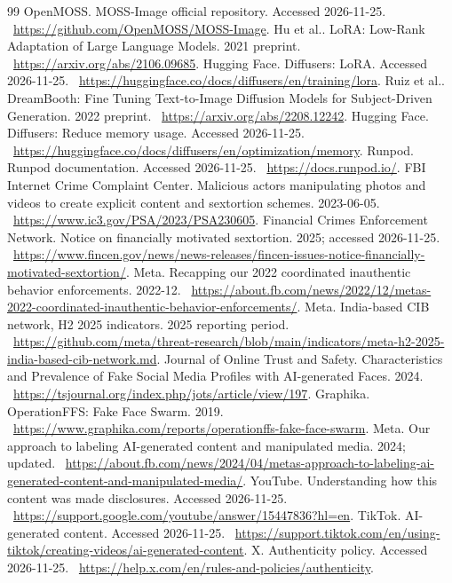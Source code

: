 \documentclass[11pt,a4paper]{article}
\begin{document}
\begin{thebibliography}{99}
 OpenMOSS. MOSS-Image official repository. Accessed 2026-11-25. \ \url{https://github.com/OpenMOSS/MOSS-Image}.
 Hu et al.. LoRA: Low-Rank Adaptation of Large Language Models. 2021 preprint. \ \url{https://arxiv.org/abs/2106.09685}.
 Hugging Face. Diffusers: LoRA. Accessed 2026-11-25. \ \url{https://huggingface.co/docs/diffusers/en/training/lora}.
 Ruiz et al.. DreamBooth: Fine Tuning Text-to-Image Diffusion Models for Subject-Driven Generation. 2022 preprint. \ \url{https://arxiv.org/abs/2208.12242}.
 Hugging Face. Diffusers: Reduce memory usage. Accessed 2026-11-25. \ \url{https://huggingface.co/docs/diffusers/en/optimization/memory}.
 Runpod. Runpod documentation. Accessed 2026-11-25. \ \url{https://docs.runpod.io/}.
 FBI Internet Crime Complaint Center. Malicious actors manipulating photos and videos to create explicit content and sextortion schemes. 2023-06-05. \ \url{https://www.ic3.gov/PSA/2023/PSA230605}.
 Financial Crimes Enforcement Network. Notice on financially motivated sextortion. 2025; accessed 2026-11-25. \ \url{https://www.fincen.gov/news/news-releases/fincen-issues-notice-financially-motivated-sextortion/}.
 Meta. Recapping our 2022 coordinated inauthentic behavior enforcements. 2022-12. \ \url{https://about.fb.com/news/2022/12/metas-2022-coordinated-inauthentic-behavior-enforcements/}.
 Meta. India-based CIB network, H2 2025 indicators. 2025 reporting period. \ \url{https://github.com/meta/threat-research/blob/main/indicators/meta-h2-2025-india-based-cib-network.md}.
 Journal of Online Trust and Safety. Characteristics and Prevalence of Fake Social Media Profiles with AI-generated Faces. 2024. \ \url{https://tsjournal.org/index.php/jots/article/view/197}.
 Graphika. OperationFFS: Fake Face Swarm. 2019. \ \url{https://www.graphika.com/reports/operationffs-fake-face-swarm}.
 Meta. Our approach to labeling AI-generated content and manipulated media. 2024; updated. \ \url{https://about.fb.com/news/2024/04/metas-approach-to-labeling-ai-generated-content-and-manipulated-media/}.
 YouTube. Understanding how this content was made disclosures. Accessed 2026-11-25. \ \url{https://support.google.com/youtube/answer/15447836?hl=en}.
 TikTok. AI-generated content. Accessed 2026-11-25. \ \url{https://support.tiktok.com/en/using-tiktok/creating-videos/ai-generated-content}.
 X. Authenticity policy. Accessed 2026-11-25. \ \url{https://help.x.com/en/rules-and-policies/authenticity}.

\end{thebibliography}
\end{document}
